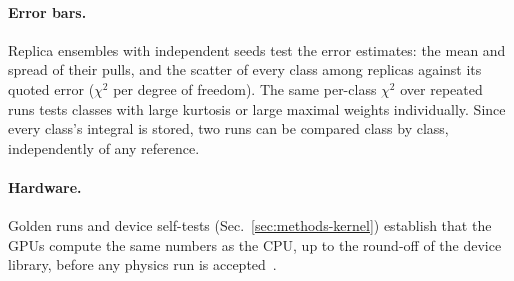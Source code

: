 \paragraph{Error bars.}
Replica ensembles with independent seeds test the error estimates: the mean and spread of their pulls, and the scatter of
every class among replicas against its quoted error ($\chi^2$ per degree of freedom). The same per-class $\chi^2$ over
repeated runs tests classes with large kurtosis or large maximal weights individually. Since every class's integral is
stored, two runs can be compared class by class, independently of any reference.

\paragraph{Hardware.}
Golden runs and device self-tests (Sec.~\ref{sec:methods-kernel}) establish that the GPUs compute the same numbers as the
CPU, up to the round-off of the device library, before any physics run is accepted~.

